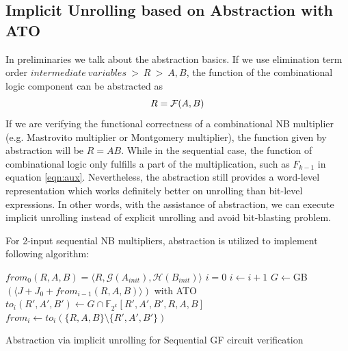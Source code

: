 \subsection{Implicit Unrolling based on Abstraction with ATO}
In preliminaries we talk about the abstraction basics. If we use elimination term order 
$intermediate~variables~>~R~>~A,B$, the function of the combinational logic component 
can be abstracted as 
$$R = {\mathcal{F}}(A,B)$$
If we are verifying the functional correctness of a combinational NB multiplier (e.g. Mastrovito multiplier
or Montgomery multiplier), the function given by abstraction will be $R=AB$.
While in the sequential case, the function of combinational logic only fulfills a part of the multiplication,
such as $F_{k-1}$ in equation \ref{eqn:aux}. Nevertheless, the abstraction still provides a word-level 
representation which works definitely better on unrolling than bit-level expressions.
In other words, with the assistance of abstraction, we can execute implicit unrolling instead of 
explicit unrolling and avoid bit-blasting problem.

For 2-input sequential NB multipliers, abstraction is utilized to implement following algorithm:
\IncMargin{1em}
\begin{algorithm}[hbt]
\SetAlgoNoLine
\LinesNumbered

  $from_0(R,A,B) = \langle R, \mathcal{G}(A_{init}), \mathcal{H}(B_{init})\rangle$\;
  $i = 0$\;
  {
  	$i \gets i + 1$\;
	$G \gets$GB$( \langle J + J_0+ from_{i-1}(R,A,B) \rangle
    )$ with ATO\;
	$to_i(R',A',B')\gets G\cap \mathbb F_{2^k}[R',A',B',R,A,B]$\;
	$from_i \gets to_i(\{R,A,B\}\setminus \{R',A',B'\})$\;
  }
\caption {Abstraction via implicit unrolling for Sequential GF circuit
  verification}
\label{alg:modified}
\end{algorithm}
\DecMargin{1em}

\begin{figure}[H]
\end{figure}

